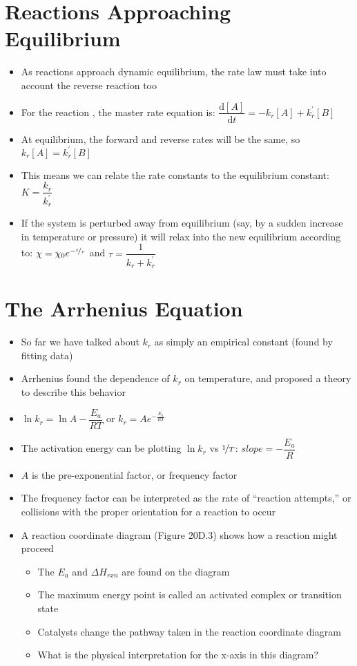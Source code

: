 \documentclass[12pt, openany, letterpaper]{memoir}
\begin{document}
\section{Reactions Approaching Equilibrium}
\begin{itemize}
	\item As reactions approach dynamic equilibrium, the rate law must take into account the reverse reaction too
	\item For the reaction , the master rate equation is: $\dfrac{\mathrm{d}[A]}{\mathrm{d}t}=-k_r[A]+k_r^\prime[B]$
	\item At equilibrium, the forward and reverse rates will be the same, so $k_r[A]=k_r^\prime[B]$
	\item This means we can relate the rate constants to the equilibrium constant: $K=\dfrac{k_r}{k_r^\prime}$
	\item If the system is perturbed away from equilibrium (say, by a sudden increase in temperature or pressure) it will relax into the new equilibrium according to: $\chi = \chi_0e^{-\nicefrac{t}{\tau}}$ and $\tau = \dfrac{1}{k_r + k_r^\prime}$
\end{itemize}

\section{The Arrhenius Equation}
\begin{itemize}
	\item So far we have talked about $k_r$ as simply an empirical constant (found by fitting data)
	\item Arrhenius found the dependence of $k_r$ on temperature, and proposed a theory to describe this behavior
	\item $\ln k_r = \ln A - \dfrac{E_a}{RT}$ or $k_r = Ae^{-\frac{E_a}{RT}}$
	\item The activation energy can be plotting $\ln k_r$ vs $\nicefrac{1}{T}$: $slope = -\dfrac{E_a}{R}$
	\item $A$ is the pre-exponential factor, or frequency factor
	\item The frequency factor can be interpreted as the rate of “reaction attempts,” or collisions with the proper orientation for a reaction to occur
	\item A reaction coordinate diagram (Figure 20D.3) shows how a reaction might proceed
	\begin{itemize}
		\item The $E_a$ and $\Delta H_{rxn}$ are found on the diagram
		\item The maximum energy point is called an activated complex or transition state
		\item Catalysts change the pathway taken in the reaction coordinate diagram
		\item What is the physical interpretation for the x-axis in this diagram?
	\end{itemize}
\end{itemize}
\end{document}
